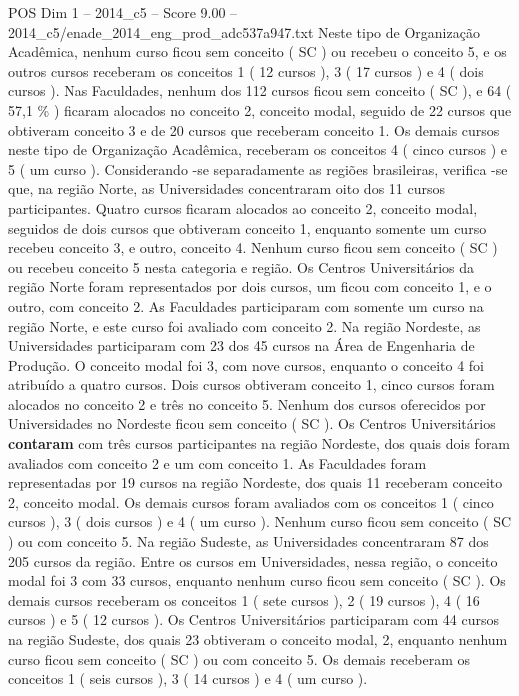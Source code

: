 \begin{textsample}{POS Dim 1 – 2014\_c5 – Score 9.00 – 2014\_c5/enade\_2014\_eng\_prod\_adc537a947.txt}
Neste tipo de Organização Acadêmica, nenhum curso ficou sem conceito ( SC ) ou recebeu o conceito 5, e os outros cursos receberam os conceitos 1 ( 12 cursos ), 3 ( 17 cursos ) e 4 ( dois cursos ).
Nas Faculdades, nenhum dos 112 cursos ficou sem conceito ( SC ), e 64 ( 57,1 \% ) ficaram alocados no conceito 2, conceito modal, seguido de 22 cursos que obtiveram conceito 3 e de 20 cursos que receberam conceito 1.
Os demais cursos neste tipo de Organização Acadêmica, receberam os conceitos 4 ( cinco cursos ) e 5 ( um curso ).
Considerando -se separadamente as regiões brasileiras, verifica -se que, na região Norte, as Universidades concentraram oito dos 11 cursos participantes.
Quatro cursos ficaram alocados ao conceito 2, conceito modal, seguidos de dois cursos que obtiveram conceito 1, enquanto somente um curso recebeu conceito 3, e outro, conceito 4.
Nenhum curso ficou sem conceito ( SC ) ou recebeu conceito 5 nesta categoria e região.
Os Centros Universitários da região Norte foram representados por dois cursos, um ficou com conceito 1, e o outro, com conceito 2.
As Faculdades participaram com somente um curso na região Norte, e este curso foi avaliado com conceito 2.
Na região Nordeste, as Universidades participaram com 23 dos 45 cursos na Área de Engenharia de Produção.
O conceito modal foi 3, com nove cursos, enquanto o conceito 4 foi atribuído a quatro cursos.
Dois cursos obtiveram conceito 1, cinco cursos foram alocados no conceito 2 e três no conceito 5.
Nenhum dos cursos oferecidos por Universidades no Nordeste ficou sem conceito ( SC ).
Os Centros Universitários \textbf{contaram} com três cursos participantes na região Nordeste, dos quais dois foram avaliados com conceito 2 e um com conceito 1.
As Faculdades foram representadas por 19 cursos na região Nordeste, dos quais 11 receberam conceito 2, conceito modal.
Os demais cursos foram avaliados com os conceitos 1 ( cinco cursos ), 3 ( dois cursos ) e 4 ( um curso ).
Nenhum curso ficou sem conceito ( SC ) ou com conceito 5.
Na região Sudeste, as Universidades concentraram 87 dos 205 cursos da região.
Entre os cursos em Universidades, nessa região, o conceito modal foi 3 com 33 cursos, enquanto nenhum curso ficou sem conceito ( SC ).
Os demais cursos receberam os conceitos 1 ( sete cursos ), 2 ( 19 cursos ), 4 ( 16 cursos ) e 5 ( 12 cursos ).
Os Centros Universitários participaram com 44 cursos na região Sudeste, dos quais 23 obtiveram o conceito modal, 2, enquanto nenhum curso ficou sem conceito ( SC ) ou com conceito 5.
Os demais receberam os conceitos 1 ( seis cursos ), 3 ( 14 cursos ) e 4 ( um curso ).

\end{textsample}
